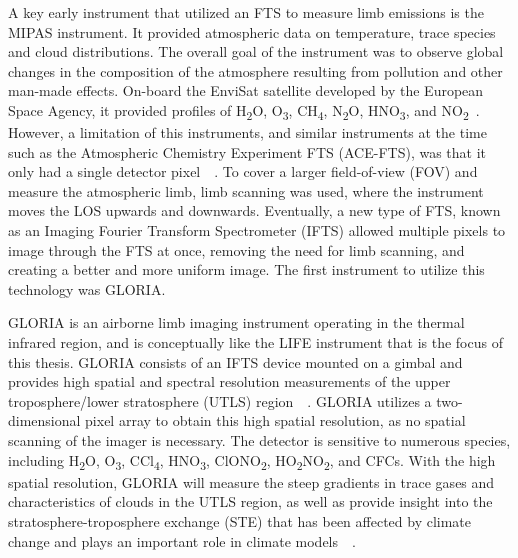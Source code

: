 A key early instrument that utilized an FTS to measure limb emissions is the MIPAS instrument. It provided atmospheric data on temperature, trace species and cloud distributions. The overall goal of the instrument was to observe global changes in the composition of the atmosphere resulting from pollution and other man-made effects. On-board the EnviSat satellite developed by the European Space Agency, it provided profiles of H\textsubscript{2}O, O\textsubscript{3}, CH\textsubscript{4}, N\textsubscript{2}O, HNO\textsubscript{3}, and NO\textsubscript{2}~\citep{MIPAS_instrument}. However, a limitation of this instruments, and similar instruments at the time such as the Atmospheric Chemistry Experiment FTS (ACE-FTS), was that it only had a single detector pixel~\citep{SPARC}~\citep{ACE_conference}. To cover a larger field-of-view (FOV) and measure the atmospheric limb, limb scanning was used, where the instrument moves the LOS upwards and downwards. Eventually, a new type of FTS, known as an Imaging Fourier Transform Spectrometer (IFTS) allowed multiple pixels to image through the FTS at once, removing the need for limb scanning, and creating a better and more uniform image. The first instrument to utilize this technology was GLORIA.

GLORIA is an airborne limb imaging instrument operating in the thermal infrared region, and is conceptually like the LIFE instrument that is the focus of this thesis. GLORIA consists of an IFTS device mounted on a gimbal and provides high spatial and spectral resolution measurements of the upper troposphere/lower stratosphere (UTLS) region~\citep{GLORIA_concept}~\citep{GLORIA_PhD}. GLORIA utilizes a two-dimensional pixel array to obtain this high spatial resolution, as no spatial scanning of the imager is necessary. The detector is sensitive to numerous species, including H\textsubscript{2}O, O\textsubscript{3}, CCl\textsubscript{4}, HNO\textsubscript{3}, ClONO\textsubscript{2}, HO\textsubscript{2}NO\textsubscript{2}, and CFCs. With the high spatial resolution, GLORIA will measure the steep gradients in trace gases and characteristics of clouds in the UTLS region, as well as provide insight into the stratosphere-troposphere exchange (STE) that has been affected by climate change and plays an important role in climate models~\citep{GLORIA_PhD}~\citep{GLORIA_objectives}.

